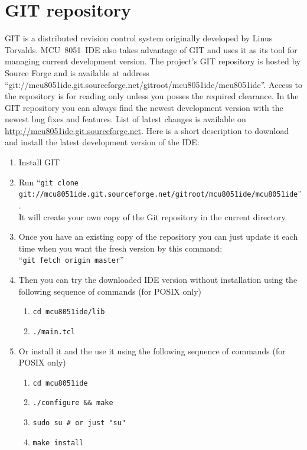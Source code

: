 \documentclass[a4paper,twoside,12pt]{book}
\begin{document}
	\section{GIT repository}
		GIT is a distributed revision control system originally developed by Linus Torvalds. MCU~8051~IDE also takes advantage of GIT and uses it as its tool for managing current development version. The project's GIT repository is hosted by Source Forge and is available at address ``{\tiny{}git://mcu8051ide.git.sourceforge.net/gitroot/mcu8051ide/mcu8051ide}''. Access to the repository is for reading only unless you posses the required clearance. In the GIT repository you can always find the newest development version with the newest bug fixes and features. List of latest changes is available on \url{http://mcu8051ide.git.sourceforge.net}. Here is a short description to download and install the latest development version of the IDE:
		\begin{enumerate}
			\setlength{\itemsep}{-3pt}
			\small
			\item Install GIT
			\item Run ``{\footnotesize{}\texttt{git clone git://mcu8051ide.git.sourceforge.net/gitroot/mcu8051ide/mcu8051ide}}''.\\
			      It will create your own copy of the Git repository in the current directory.
			\item Once you have an existing copy of the repository you can just update it each time when you want the fresh version by this command:\\
			      ``\texttt{git fetch origin master}''
			\item Then you can try the downloaded IDE version without installation using the following sequence of commands (for POSIX only)
				\begin{enumerate}
					\setlength{\itemsep}{-3pt}
					\small
					\item \texttt{cd mcu8051ide/lib}
					\item \texttt{./main.tcl}
				\end{enumerate}
			\item Or install it and the use it using the following sequence of commands (for POSIX only)
				\begin{enumerate}
					\setlength{\itemsep}{-3pt}
					\small
					\item \texttt{cd mcu8051ide}
					\item \texttt{./configure \&\& make}
					\item \texttt{sudo su \# or just "su"}
					\item \texttt{make install}
				\end{enumerate}
		\end{enumerate}
\end{document}

